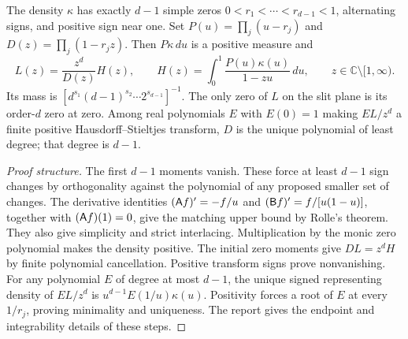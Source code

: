 \begin{theorem}
\label{ado:integration:compensation}
The density $\kappa$ has exactly $d-1$ simple zeros
$0<r_1<\cdots<r_{d-1}<1$, alternating signs, and positive sign near one.
Set $P(u)=\prod_j(u-r_j)$ and $D(z)=\prod_j(1-r_jz)$. Then
$P\kappa\,du$ is a positive measure and
\[
 L(z)=\frac{z^d}{D(z)}H(z),\qquad
 H(z)=\int_0^1\frac{P(u)\kappa(u)}{1-zu}\,du,
 \qquad z\in\mathbb C\setminus[1,\infty).
\]
Its mass is $[d^{s_1}(d-1)^{s_2}\cdots2^{s_{d-1}}]^{-1}$.
The only zero of $L$ on the slit plane is its order-$d$ zero at zero.
Among real polynomials $E$ with $E(0)=1$ making $EL/z^d$ a finite
positive Hausdorff--Stieltjes transform, $D$ is the unique polynomial
of least degree; that degree is $d-1$.
\end{theorem}
\begin{proof}[Proof structure]
The first $d-1$ moments vanish. These force at least $d-1$ sign changes
by orthogonality against the polynomial of any proposed smaller set of
changes. The derivative identities
$(\mathsf A f)'=-f/u$ and $(\mathsf B f)'=f/[u(1-u)]$, together with
$(\mathsf A f)(1)=0$, give the matching upper bound by Rolle's theorem.
They also give simplicity and strict interlacing. Multiplication by the
monic zero polynomial makes the density positive. The initial zero
moments give $DL=z^dH$ by finite polynomial cancellation. Positive
transform signs prove nonvanishing. For any polynomial $E$ of degree
at most $d-1$, the unique signed representing density of $EL/z^d$ is
$u^{d-1}E(1/u)\kappa(u)$. Positivity forces a root of $E$ at every
$1/r_j$, proving minimality and uniqueness. The report gives the endpoint
and integrability details of these steps.
\end{proof}

